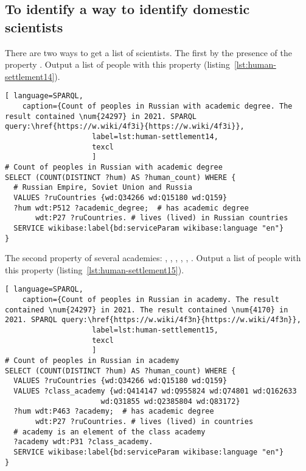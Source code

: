\subsection{To identify a way to identify domestic scientists}

There are two ways to get a list of scientists. 
The first by the presence of the property . 
Output a list of people with this property (listing~\protect\ref{lst:human-settlement14}).

\begin{lstlisting}[ language=SPARQL,
    caption={Count of peoples in Russian with academic degree. The result contained \num{24297} in 2021. SPARQL query:\href{https://w.wiki/4f3i}{https://w.wiki/4f3i}},  
                    label=lst:human-settlement14,
                    texcl 
                    ]
# Count of peoples in Russian with academic degree
SELECT (COUNT(DISTINCT ?hum) AS ?human_count) WHERE {
  # Russian Empire, Soviet Union and Russia
  VALUES ?ruCountries {wd:Q34266 wd:Q15180 wd:Q159}
  ?hum wdt:P512 ?academic_degree;  # has academic degree 
       wdt:P27 ?ruCountries. # lives (lived) in Russian countries
  SERVICE wikibase:label{bd:serviceParam wikibase:language "en"}
}
\end{lstlisting}%

The second property  of several academies: , , , , , . Output a list of people with this property (listing~\protect\ref{lst:human-settlement15}).

\begin{lstlisting}[ language=SPARQL, 
    caption={Count of peoples in Russian in academy. The result contained \num{24297} in 2021. The result contained \num{4170} in 2021. SPARQL query:\href{https://w.wiki/4f3n}{https://w.wiki/4f3n}},
                    label=lst:human-settlement15,
                    texcl 
                    ]
# Count of peoples in Russian in academy
SELECT (COUNT(DISTINCT ?hum) AS ?human_count) WHERE {
  VALUES ?ruCountries {wd:Q34266 wd:Q15180 wd:Q159}
  VALUES ?class_academy {wd:Q414147 wd:Q955824 wd:Q74801 wd:Q162633 
                      wd:Q31855 wd:Q2385804 wd:Q83172}
  ?hum wdt:P463 ?academy;  # has academic degree 
       wdt:P27 ?ruCountries. # lives (lived) in countries
  # academy is an element of the class academy
  ?academy wdt:P31 ?class_academy. 
  SERVICE wikibase:label{bd:serviceParam wikibase:language "en"}
}
\end{lstlisting}%

